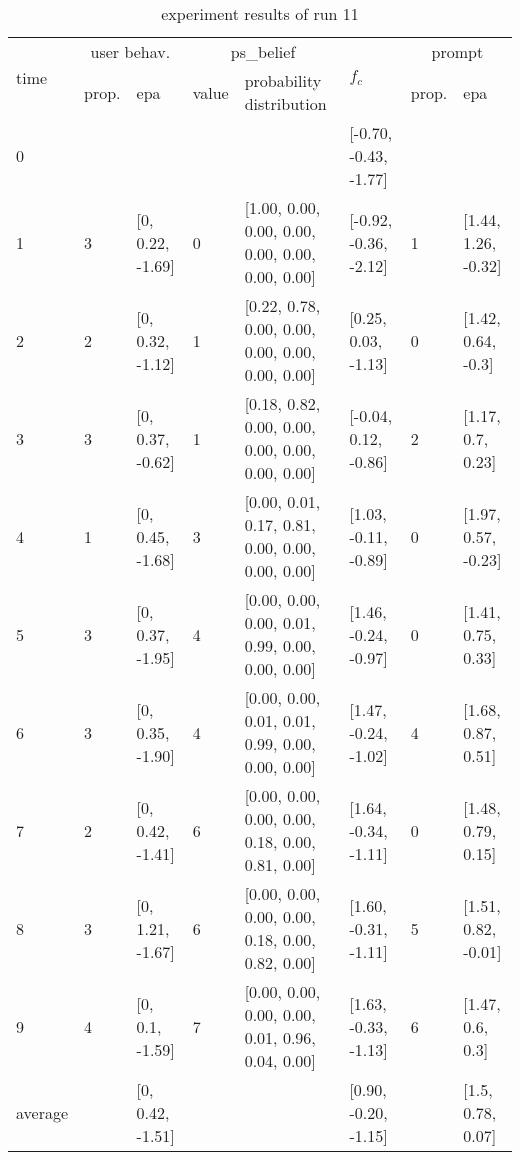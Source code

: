 \begin{table}[htbp]\footnotesize
\caption{experiment results of run 11}
\begin{tabular}{|p{0.4cm}|p{0.6cm}|l|p{0.6cm}|p{3.3cm}|l|p{0.6cm}|l|}
\hline

\multirow{2}{*}{time} & \multicolumn{2}{c|}{user behav.} & \multicolumn{2}{c|}{ps\_belief} &
\multirow{2}{*}{$f_c$} & \multicolumn{2}{c|}{prompt} \\ \cline{2-5}\cline{ 7- 8}
& prop. & epa & value & probability distribution &  & prop. & epa \\ \hline

0 & \multicolumn{1}{l|}{} &  & \multicolumn{1}{l|}{} &  & [-0.70, -0.43, -1.77] & \multicolumn{1}{l|}{} &  \\ \hline
1 & 3 & [0, 0.22, -1.69] & 0 & [1.00, 0.00, 0.00, 0.00, 0.00, 0.00, 0.00, 0.00] & [-0.92, -0.36, -2.12] & 1 & [1.44, 1.26, -0.32] \\ \hline
2 & 2 & [0, 0.32, -1.12] & 1 & [0.22, 0.78, 0.00, 0.00, 0.00, 0.00, 0.00, 0.00] & [0.25, 0.03, -1.13] & 0 & [1.42, 0.64, -0.3] \\ \hline
3 & 3 & [0, 0.37, -0.62] & 1 & [0.18, 0.82, 0.00, 0.00, 0.00, 0.00, 0.00, 0.00] & [-0.04, 0.12, -0.86] & 2 & [1.17, 0.7, 0.23] \\ \hline
4 & 1 & [0, 0.45, -1.68] & 3 & [0.00, 0.01, 0.17, 0.81, 0.00, 0.00, 0.00, 0.00] & [1.03, -0.11, -0.89] & 0 & [1.97, 0.57, -0.23] \\ \hline
5 & 3 & [0, 0.37, -1.95] & 4 & [0.00, 0.00, 0.00, 0.01, 0.99, 0.00, 0.00, 0.00] & [1.46, -0.24, -0.97] & 0 & [1.41, 0.75, 0.33] \\ \hline
6 & 3 & [0, 0.35, -1.90] & 4 & [0.00, 0.00, 0.01, 0.01, 0.99, 0.00, 0.00, 0.00] & [1.47, -0.24, -1.02] & 4 & [1.68, 0.87, 0.51] \\ \hline
7 & 2 & [0, 0.42, -1.41] & 6 & [0.00, 0.00, 0.00, 0.00, 0.18, 0.00, 0.81, 0.00] & [1.64, -0.34, -1.11] & 0 & [1.48, 0.79, 0.15] \\ \hline
8 & 3 & [0, 1.21, -1.67] & 6 & [0.00, 0.00, 0.00, 0.00, 0.18, 0.00, 0.82, 0.00] & [1.60, -0.31, -1.11] & 5 & [1.51, 0.82, -0.01] \\ \hline
9 & 4 & [0, 0.1, -1.59] & 7 & [0.00, 0.00, 0.00, 0.00, 0.01, 0.96, 0.04, 0.00] & [1.63, -0.33, -1.13] & 6 & [1.47, 0.6, 0.3] \\ \hline
\multicolumn{1}{|l|}{average} & \multicolumn{1}{l|}{} & [0, 0.42, -1.51] & \multicolumn{1}{l|}{} &  & [0.90, -0.20, -1.15] & \multicolumn{1}{l|}{} & [1.5, 0.78, 0.07] \\ \hline
\end{tabular}
\label{}
\end{table}

